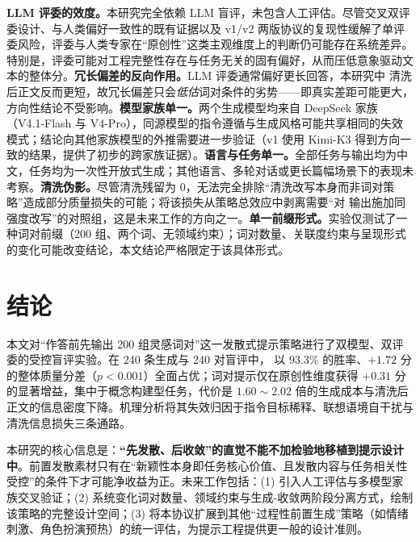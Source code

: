 \textbf{LLM 评委的效度。}本研究完全依赖 LLM 盲评，未包含人工评估。尽管交叉双评委设计、与人类偏好一致性的既有证据\cite{zheng2023judging}以及 v1/v2 两版协议的复现性缓解了单评委风险，评委与人类专家在“原创性”这类主观维度上的判断仍可能存在系统差异。特别是，评委可能对工程完整性存在与任务无关的固有偏好，从而压低意象驱动文本的整体分。\textbf{冗长偏差的反向作用。}LLM 评委通常偏好更长回答\cite{zheng2023judging}，本研究中 \wordpairs{} 清洗后正文反而更短，故冗长偏差只会\emph{低估}词对条件的劣势——即真实差距可能更大，方向性结论不受影响。\textbf{模型家族单一。}两个生成模型均来自 DeepSeek 家族（V4.1-Flash 与 V4-Pro）\cite{deepseekv3}，同源模型的指令遵循与生成风格可能共享相同的失效模式；结论向其他家族模型的外推需要进一步验证（v1 使用 Kimi-K3 得到方向一致的结果，提供了初步的跨家族证据）。\textbf{语言与任务单一。}全部任务与输出均为中文，任务均为一次性开放式生成；其他语言、多轮对话或更长篇幅场景下的表现未考察。\textbf{清洗伪影。}尽管清洗残留为 0，无法完全排除“清洗改写本身而非词对策略”造成部分质量损失的可能；将该损失从策略总效应中剥离需要“对 \baseline{} 输出施加同强度改写”的对照组，这是未来工作的方向之一。\textbf{单一前缀形式。}实验仅测试了一种词对前缀（200 组、两个词、无领域约束）；词对数量、关联度约束与呈现形式的变化可能改变结论，本文结论严格限定于该具体形式。

\section{结论}\label{sec:conclusion}

本文对“作答前先输出 200 组灵感词对”这一发散式提示策略进行了双模型、双评委的受控盲评实验。在 240 条生成与 240 对盲评中，\baseline{} 以 93.3\% 的胜率、$+1.72$ 分的整体质量分差（$p<0.001$）全面占优；词对提示仅在原创性维度获得 $+0.31$ 分的显著增益，集中于概念构建型任务，代价是 $1.60\sim2.02$ 倍的生成成本与清洗后正文的信息密度下降。机理分析将其失效归因于指令目标稀释、联想语境自干扰与清洗信息损失三条通路。

本研究的核心信息是：\textbf{“先发散、后收敛”的直觉不能不加检验地移植到提示设计中}。前置发散素材只有在“新颖性本身即任务核心价值、且发散内容与任务相关性受控”的条件下才可能净收益为正。未来工作包括：(1) 引入人工评估与多模型家族交叉验证；(2) 系统变化词对数量、领域约束与生成-收敛两阶段分离方式，绘制该策略的完整设计空间；(3) 将本协议扩展到其他“过程性前置生成”策略（如情绪刺激、角色扮演预热）的统一评估，为提示工程提供更一般的设计准则。
